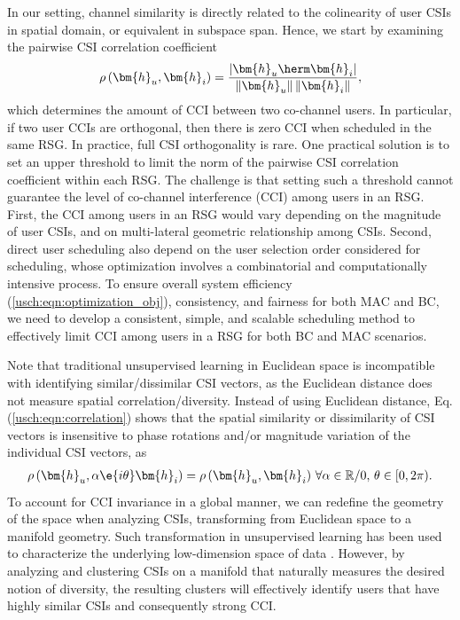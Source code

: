 In our setting, channel similarity is directly related to the colinearity of user CSIs in spatial domain, or equivalent
in subspace span. Hence, we start by examining the pairwise CSI correlation coefficient
\begin{equation}
	\rho \left( \bm{h}_{u},\bm{h}_{i} \right) = \frac{ | \bm{h}_u\herm \bm{h}_i |}{ \left\| \bm{h}_u \right\|\left\|\bm{ h}_i \right\|}, \label{usch:eqn:correlation}
\end{equation}
which determines the amount of CCI between two co-channel users. In particular, if two user CCIs are orthogonal, then
there is zero CCI when scheduled in the same RSG. 
In practice, full CSI orthogonality is rare. 
One practical solution is to set an upper threshold to limit the norm of the 
pairwise CSI correlation coefficient within each RSG. The challenge 
is that setting such a threshold cannot guarantee the
level of co-channel interference (CCI) among users
in an RSG. First, the CCI among users in an RSG would 
vary depending on the magnitude
of user CSIs, and on multi-lateral geometric relationship among
CSIs. Second, direct user scheduling also depend on the user selection order
considered for scheduling, whose optimization involves a 
combinatorial and computationally intensive process. 
To ensure overall system efficiency (\ref{usch:eqn:optimization_obj}),
consistency, and fairness for both MAC and BC,
we need to develop a consistent, simple, and scalable scheduling method to 
effectively limit CCI among users in a RSG for both 
BC and MAC scenarios.

Note that traditional unsupervised learning in Euclidean space is incompatible with identifying similar/dissimilar CSI vectors, as the Euclidean distance does not measure 
spatial correlation/diversity. Instead of using Euclidean distance, Eq.(\ref{usch:eqn:correlation}) shows that the spatial similarity or dissimilarity of CSI vectors is insensitive to phase rotations and/or magnitude variation of the individual CSI vectors, as
\begin{align}
	\rho \left( \bm{h}_{u},\alpha\e{i\theta}\bm{h}_{i} \right)=\rho \left( \bm{h}_{u},\bm{h}_{i} \right)\,\forall \alpha\in\mathbb{R}/0,\,\theta\in[0,2\pi).\nonumber
\end{align}
To account for CCI invariance in a global manner, we can redefine the geometry of the space when analyzing CSIs, transforming from Euclidean space to a manifold geometry. Such transformation
in unsupervised learning has been used to characterize the underlying low-dimension space of data \cite{Goh2008}. 
However, by analyzing and clustering CSIs on a manifold that naturally measures the desired notion of diversity, the resulting clusters will effectively identify users that have highly
similar CSIs and consequently  strong CCI.


